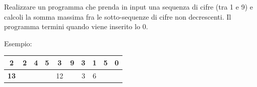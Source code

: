 \begin{Exercise}[label={ex:sequenza}]
  Realizzare un programma che prenda in input una sequenza di cifre (tra 1 e 9) e calcoli la somma massima fra le sotto-sequenze di cifre non decrescenti. Il programma termini quando viene inserito lo 0.
  
  Esempio:
  \begin{tabular}{|c c c c|c c|c|c c|c|}
    \hline
    2 & 2 & 4 & 5 & 3 & 9 & 3 & 1 & 5 & 0 \\
    \hline
    \textbf{13} & & & & 12 & & 3 & 6 & & \\
    \hline
  \end{tabular}

\end{Exercise}

\begin{Answer}[ref={ex:sequenza}]
  
\end{Answer}